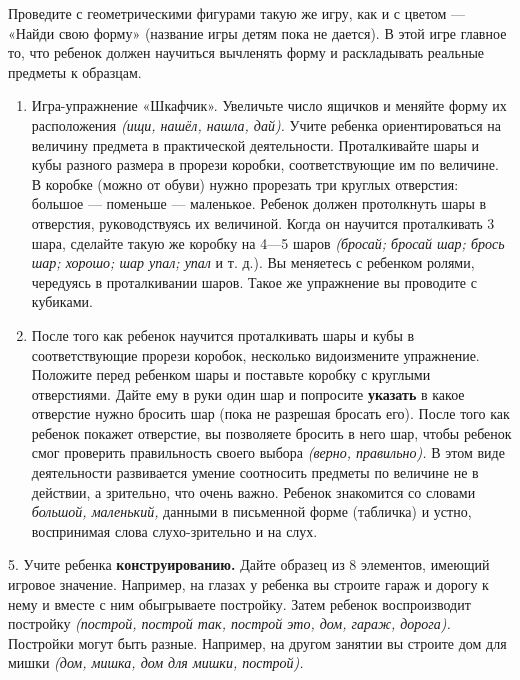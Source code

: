 \documentclass{book}
\renewcommand{\emph}[1]{\textit{#1}}
\begin{document}
Проведите с геометрическими фигурами такую же игру, как и с цветом ---
«Найди свою форму» (название игры детям пока не дается). В этой игре
главное то, что ребенок должен научиться вычленять форму и раскладывать
реальные предметы к образцам.


\begin{enumerate}
\def\labelenumi{\arabic{enumi}.}
\setcounter{enumi}{2}
\item
  
  Игра-упражнение «Шкафчик». Увеличьте число ящичков и меняйте форму их
  расположения \emph{(ищи, нашёл, нашла, дай).} Учите ребенка
  ориентироваться на величину предмета в практической деятельности.
  Проталкивайте шары и кубы разного размера в прорези коробки,
  соответствующие им по величине. В коробке (можно от обуви) нужно
  прорезать три круглых отверстия: большое --- поменьше --- маленькое.
  Ребенок должен протолкнуть шары в отверстия, руководствуясь их
  величиной. Когда он научится проталкивать 3 шара, сделайте такую же
  коробку на 4---5 шаров \emph{(бросай; бросай шар; брось шар; хорошо;
  шар упал; упал} и т. д.). Вы меняетесь с ребенком ролями, чередуясь в
  проталкивании шаров. Такое же упражнение вы проводите с кубиками.
  
\item
  
  После того как ребенок научится проталкивать шары и кубы в
  соответствующие прорези коробок, несколько видоизмените упражнение.
  Положите перед ребенком шары и поставьте коробку с круглыми
  отверстиями. Дайте ему в руки один шар и попросите \textbf{указать} в
  какое отверстие нужно бросить шар (пока не разрешая бросать его).
  После того как ребенок покажет отверстие, вы позволяете бросить в него
  шар, чтобы ребенок смог проверить правильность своего выбора
  \emph{(верно, правильно).} В этом виде деятельности развивается умение
  соотносить предметы по величине не в действии, а зрительно, что очень
  важно. Ребенок знакомится со словами \emph{большой, маленький,}
  данными в письменной форме (табличка) и устно, воспринимая слова
  слухо-зрительно и на слух.
  
\end{enumerate}


5. Учите ребенка \textbf{конструированию.} Дайте образец из 8 элементов,
имеющий игровое значение. Например, на глазах у ребенка вы строите гараж
и дорогу к нему и вместе с ним обыгрываете постройку. Затем ребенок
воспроизводит постройку \emph{(построй, построй так, построй это, дом,
гараж, дорога).} Постройки могут быть разные. Например, на другом
занятии вы строите дом для мишки \emph{(дом, мишка, дом для мишки,
построй).}
\end{document}
